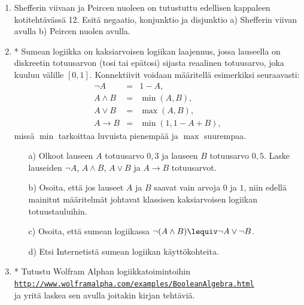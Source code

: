 \begin{enumerate}
\item Shefferin viivaan ja Peircen nuoleen on tutustuttu
edellisen kappaleen kotitehtävässä 12. Esitä negaatio,
konjunktio ja disjunktio a) Shefferin viivan avulla b)
Peircen nuolen avulla.

\item * %
Sumean logiikka on kaksiarvoisen logiikan
laajennus, jossa lauseella on diskreetin totuusarvon
(tosi tai epätosi) sijasta reaalinen totuusarvo, joka
kuuluu välille $[0,1]$. Konnektiivit voidaan määritellä
esimerkiksi seuraavasti:
\[
\begin{array}{rcl}
\lnot A &=& 1-A,\\
A\land B &=& \min(A,B),\\
A\lor B &=& \max(A,B),\\
A\to B
&=& \min(1,1-A+B),
\end{array}
\]
missä $\min$ tarkoittaa luvuista pienempää ja $\max$
suurempaa.

\begin{itemize}
\item[a)] Olkoot lauseen $A$ totuusarvo $0,3$ ja lauseen
$B$ totuusarvo $0,5$. Laske lauseiden $\lnot A$, $A\land
B$, $A\lor B$ ja $A \to B$ totuusarvot.
\item[b)] Osoita, että jos lauseet $A$ ja $B$ saavat
vain arvoja $0$ ja $1$, niin edellä mainitut määritelmät johtavat
klassisen kaksiarvoisen logiikan totuustauluihin.
\item[c)] Osoita, että sumean logiikassa $\lnot(A\land B)
\lequiv \lnot A \lor \lnot B$.
\item[d)] Etsi Internetistä sumean logiikan
käyttökohteita.
\end{itemize}

\item * %
Tutustu Wolfram Alphan
logiikkatoimintoihin\\
\href{http://www.wolframalpha.com/examples/BooleanAlgebra.html}{{\tt http://www.wolframalpha.com/examples/BooleanAlgebra.html}}\\
ja yritä laskea sen avulla joitakin kirjan tehtäviä.


\end{enumerate}
